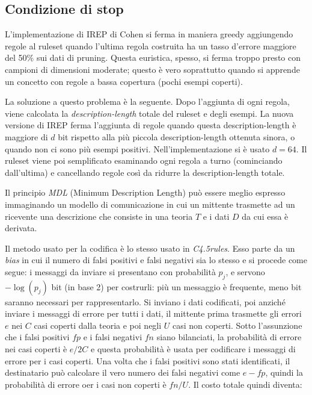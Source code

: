 \subsection*{Condizione di stop}
L'implementazione di IREP di Cohen si ferma in maniera greedy aggiungendo regole al ruleset quando l'ultima regola costruita ha un tasso d'errore maggiore del 50\% sui dati di pruning. Questa euristica, spesso, si ferma troppo presto con campioni di dimensioni moderate; questo è vero soprattutto quando si apprende un concetto con regole a bassa copertura (pochi esempi coperti).

La soluzione a questo problema è la seguente. Dopo l'aggiunta di ogni regola, viene calcolata la \textit{description-length} totale del ruleset e degli esempi. La nuova versione di IREP ferma l'aggiunta di regole quando questa description-length è maggiore di $d$ bit rispetto alla più piccola description-length ottenuta sinora, o quando non ci sono più esempi positivi. Nell'implementazione si è usato $d = 64$. Il ruleset viene poi semplificato esaminando ogni regola a turno (cominciando dall'ultima) e cancellando regole così da ridurre la description-length totale.

Il principio \emph{MDL} (Minimum Description Length) può essere meglio espresso immaginando un modello di comunicazione in cui un mittente trasmette ad un ricevente una descrizione che consiste in una teoria $T$ e i dati $D$ da cui essa è derivata\cite{Quinlan:1989:IDT:70758.70761}.

Il metodo usato per la codifica è lo stesso usato in \emph{C4.5rules}\cite{Quinlan95mdland}. Esso parte da un \emph{bias} in cui il numero di falsi positivi e falsi negativi sia lo stesso e si procede come segue: i messaggi da inviare si presentano con probabilità $p_j$, e servono $-\log(p_j)$ bit (in base 2) per costrurli: più un messaggio è frequente, meno bit saranno necessari per rappresentarlo. Si inviano i dati codificati, poi anziché inviare i messaggi di errore per tutti i dati, il mittente prima trasmette gli errori $e$ nei $C$ casi coperti dalla teoria e poi negli $U$ casi non coperti. Sotto l'assunzione che i falsi positivi $fp$ e i falsi negativi $fn$ siano bilanciati, la probabilità di errore nei casi coperti è $e/2C$ e questa probabilità è usata per codificare i messaggi di errore per i casi coperti. Una volta che i falsi positivi sono stati identificati, il destinatario può calcolare il vero numero dei falsi negativi come $e-fp$, quindi la probabilità di errore oer i casi non coperti è $fn/U$. Il costo totale quindi diventa:

